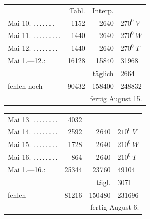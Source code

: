 \begin{center}
\begin{tabular}{@{}p{.36\linewidth}rrl@{}}
&Tabl.&Interp.&\\
Mai 10. \BJournalDay{☉}\nobreak\hspace{.2em}\mbox{.\,.\,.\,.\,.\,.\,.}\hfill&1152&2640&\(\mathit{270}^0\ V\)\\
Mai 11. \BJournalDay{☾}\nobreak\hspace{.2em}\mbox{.\,.\,.\,.\,.\,.\,.\,.\,.}\hfill&1440&2640&\(\mathit{270}^0\ W\)\\
Mai 12. \BJournalDay{♂}\nobreak\hspace{.2em}\mbox{.\,.\,.\,.\,.\,.\,.\,.}\hfill&1440&2640&\(\mathit{270}^0\ T\)\\
\hfill Mai 1.—12.:&16128&15840&31968\\
&&täglich&2664\\
\hfill fehlen noch&90432&158400&248832\\
\multicolumn{4}{r}{fertig August 15.}\\
\hline
\end{tabular}
\end{center}
\begin{center}
\begin{tabular}{@{}p{.36\linewidth}rrl@{}}
Mai 13. \BJournalDay{☿}\nobreak\hspace{.2em}\mbox{.\,.\,.\,.\,.\,.\,.\,.}\hfill&4032&&\\
Mai 14. \BJournalDay{♃}\nobreak\hspace{.2em}\mbox{.\,.\,.\,.\,.\,.\,.\,.}\hfill&2592&2640&\(\mathit{210}^0\ V\)\\
Mai 15. \BJournalDay{♀}\nobreak\hspace{.2em}\mbox{.\,.\,.\,.\,.\,.\,.\,.}\hfill&1728&2640&\(\mathit{210}^0\ W\)\\
Mai 16. \BJournalDay{♄}\nobreak\hspace{.2em}\mbox{.\,.\,.\,.\,.\,.\,.\,.}\hfill&864&2640&\(\mathit{210}^0\ T\)\\
\hfill Mai 1.—16.:&25344&23760&49104\\
&&tägl.&3071\\
\hfill fehlen&81216&150480&231696\\
\multicolumn{4}{r}{fertig August 6.}\\
\hline
\end{tabular}
\end{center}
